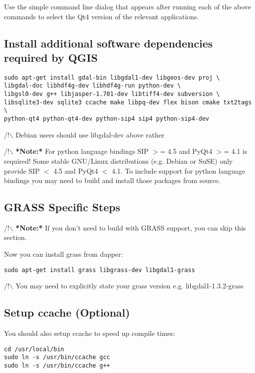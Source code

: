Use the simple command line dialog that appears after running each of the
above commands to select the Qt4 version of the relevant applications.

\subsection{Install additional software dependencies required by QGIS}
\begin{verbatim}
sudo apt-get install gdal-bin libgdal1-dev libgeos-dev proj \
libgdal-doc libhdf4g-dev libhdf4g-run python-dev \
libgsl0-dev g++ libjasper-1.701-dev libtiff4-dev subversion \
libsqlite3-dev sqlite3 ccache make libpq-dev flex bison cmake txt2tags \
python-qt4 python-qt4-dev python-sip4 sip4 python-sip4-dev
\end{verbatim}

/!$\backslash$ Debian users should use libgdal-dev above rather

/!$\backslash$ \textbf{*Note:*} For python language bindings SIP $>$= 4.5 and PyQt4 $>$= 4.1 is required! Some stable GNU/Linux
distributions (e.g. Debian or SuSE) only provide SIP $<$ 4.5 and PyQt4 $<$ 4.1. To include support for python 
language bindings you may need to build and install those packages from source.

\subsection{GRASS Specific Steps}
/!$\backslash$ \textbf{*Note:*} If you don't need to build with GRASS support,  you can
skip this section.

Now you can install grass from dapper:

\begin{verbatim}
sudo apt-get install grass libgrass-dev libgdal1-grass 
\end{verbatim}

/!$\backslash$ You may need to explicitly state your grass version e.g. libgdal1-1.3.2-grass

\subsection{Setup ccache (Optional)}
You should also setup ccache to speed up compile times:

\begin{verbatim}
cd /usr/local/bin 
sudo ln -s /usr/bin/ccache gcc 
sudo ln -s /usr/bin/ccache g++ 
\end{verbatim}

